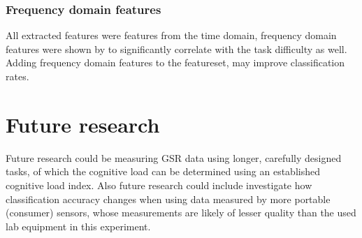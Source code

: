 \documentclass[11pt,leqno,letterpaper]{report} %
\begin{document}
\subsubsection{Frequency domain features}
All extracted features were features from the time domain, frequency domain features were shown by \citep{Nourbakhsh2012} to significantly correlate with the task difficulty as well. Adding frequency domain features to the featureset, may improve classification rates.

\section{Future research}
Future research could be measuring GSR data using longer, carefully designed tasks, of which the cognitive load can be determined using an established cognitive load index.
Also future research could include investigate how classification accuracy changes when using data measured by more portable (consumer) sensors, whose measurements are likely of lesser quality than the used lab equipment in this experiment.
 




{}
%
\end{document}
